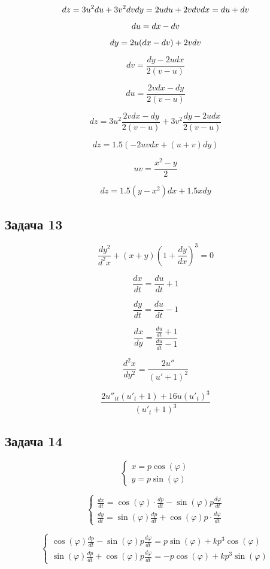 \documentclass[a4paper,12pt]{article}
\begin{document}
\[
dz = 3u^2du + 3v^2dv \\
dy = 2udu + 2vdv \\
dx = du + dv 
\]

\[
du = dx - dv \\
\]

\[
dy = 2u(dx-dv) + 2vdv \\
\]

\[
dv = \frac{dy-2udx}{2(v-u)}
\]

\[
du = \frac{2vdx - dy}{2(v-u)}
\]

\[
dz = 3u^2\frac{2vdx - dy}{2(v-u)} + 3v^2\frac{dy-2udx}{2(v-u)}
\]

\[
dz = 1.5(-2uvdx+(u+v)dy)
\]

\[
uv=\frac{x^2-y}{2}
\]

\[
dz = 1.5(y-x^2)dx + 1.5xdy 
\]

\subsection{Задача 13}

\[
\frac{dy^2}{d^2x} + (x+y)(1+\frac{dy}{dx})^3 = 0
\]

\[
\frac{dx}{dt} = \frac{du}{dt} +1
\]

\[
\frac{dy}{dt} = \frac{du}{dt} -1
\]

\[
\frac{dx}{dy} = \frac{\frac{du}{dt}+1}{\frac{du}{dt}-1}
\]

\[
\frac{d^2x}{dy^2} = \frac{2u''}{(u'+1)^2}
\]

\[
\frac{2u''_{tt}(u'_{t}+1)+16u(u'_{t})^3}{(u'_{t}+1)^3}
\]

\subsection{Задача 14}

\[
\begin{cases}
    x = p\cos(\varphi) \\
    y = p \sin(\varphi)
\end{cases}
\]

\[  
\begin{cases}
    \frac{dx}{dt} = \cos(\varphi) \cdot \frac{dp}{dt} - \sin(\varphi)p\frac{d\varphi}{dt} \\
    \frac{dy}{dt} = \sin(\varphi)\frac{dp}{dt} + \cos(\varphi) p \cdot \frac{d\varphi}{dt}
\end{cases}
\]

\[
\begin{cases}
    \cos(\varphi)\frac{dp}{dt} - \sin(\varphi)p\frac{d\varphi}{dt} = p\sin(\varphi)+kp^3\cos(\varphi)\\
    \sin(\varphi)\frac{dp}{dt} + \cos(\varphi)p\frac{d\varphi}{dt} = -p\cos(\varphi)+kp^3\sin(\varphi)
\end{cases}
\]
\end{document}
